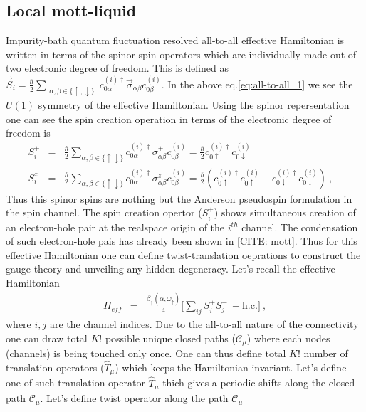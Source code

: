 \documentclass[reprint,prb,superscriptaddress]{revtex4-2}
\begin{document}
\subsection{Local mott-liquid}
Impurity-bath quantum fluctuation resolved all-to-all effective Hamiltonian is written in terms of the spinor spin operators which are individually made out of two electronic degree of freedom. This is defined as $\vec{S}_i=\frac{\hbar}{2} \displaystyle\sum_{\substack{ \alpha,\beta\in \{\uparrow,\downarrow\}}}  c_{0\alpha}^{(i)\dagger} \vec{\sigma}_{\alpha\beta} c_{0\beta}^{(i)}$. In the above eq.\eqref{eq:all-to-all_1} we see the $U(1)$ symmetry of the effective Hamiltonian. Using the spinor repersentation one can see the spin creation operation in terms of the electronic degree of freedom is 
\begin{eqnarray}
S_i^+ &=& \frac{\hbar}{2} \displaystyle\sum_{\alpha,\beta\in \{\uparrow\downarrow\}} c_{0\alpha}^{(i)\dagger} {\sigma}^{+}_{\alpha\beta} c_{0\beta}^{(i)}
=\frac{\hbar}{2} c_{0\uparrow}^{(i)\dagger} c_{0\downarrow}^{(i)}  \\
S_i^z &=& \frac{\hbar}{2} \displaystyle\sum_{\alpha,\beta\in \{\uparrow\downarrow\}} c_{0\alpha}^{(i)\dagger} {\sigma}^{z}_{\alpha\beta} c_{0\beta}^{(i)} =\frac{\hbar}{2} (c_{0\uparrow}^{(i)\dagger} c_{0\uparrow}^{(i)} - c_{0\downarrow}^{(i)\dagger} c_{0\downarrow}^{(i)} )~,~~~~
\end{eqnarray}
Thus this spinor spins are nothing but the Anderson pseudospin formulation in the spin channel. The spin creation opertor ($S_i^+$) shows simultaneous creation of an electron-hole pair at the realspace origin of the $i^{th}$ channel. The condensation of such electron-hole pais has already been shown in [CITE: mott]. Thus for this effective Hamiltonian one can define twist-translation oeprations to construct the gauge theory and unveiling any hidden degeneracy. Let's recall the effective Hamiltonian
\begin{eqnarray}
H_{eff} &=& \frac{\beta_{\uparrow}(\alpha,\omega_{\uparrow})}{4} \bigg[ \displaystyle\sum_{ij} S_i^+S_j^- ~+ \textrm{h.c.} \bigg]~,
\end{eqnarray}
where $i,j$ are the channel indices. Due to the all-to-all nature of the connectivity one can draw total $K!$ possible unique closed paths ($\mathcal{C}_{\mu}$) where each nodes (channels) is being touched only once. One can thus define total $K!$ number of translation operators ($\hat{T}_{\mu}$) which keeps the Hamiltonian invariant. Let's define one of such translation operator $\hat{T}_{\mu}$ thich gives a periodic shifts along the closed path $\mathcal{C}_{\mu}$. Let's define twist operator along the path $\mathcal{C}_{\mu}$
\end{document}

